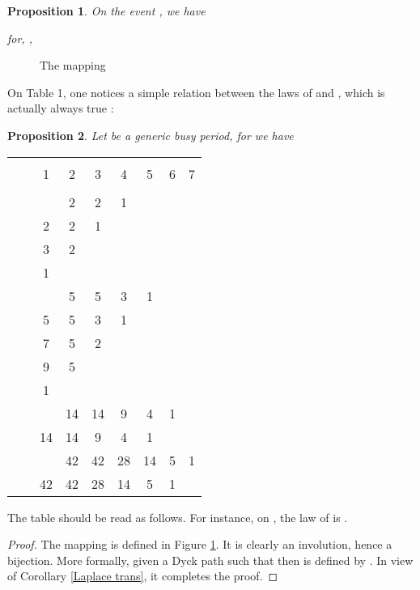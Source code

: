 \documentclass[11pt,a4paper]{article}
\numberwithin{equation}{section}
\newtheorem{prop}{Proposition}[section]
\newcommand{\1}{\mathbbm{1}}
\begin{document}
\begin{prop}\label{Rec}
On the event , we have

for, ,

\end{prop}
\begin{center}
\begin{figure}[hbt]

\caption{The mapping }
\label{Psi}
\end{figure}
\end{center}
On Table 1, one notices a simple relation between the laws of
 and , which is actually always true :
\begin{prop}
Let  be a generic busy period, for  we have

\end{prop}
\begin{center}
\begin{tabular}{|c|c|c|c|c|c|c|c|c|}
\hline
&&&&&&&& \\
&& 1 & 2 & 3 & 4 & 5 & 6 & 7  \\
&&&&&&&& \\ \hline
  & & & 2 & 2 & 1 & & & \\
 & & 2 & 2 & 1 & & &&  \\
 & & 3 & 2 & & & &&  \\
  & & 1 & & & & & & \\ \hline
  & & & 5 & 5 & 3 & 1 &&  \\
 & & 5 & 5 & 3 & 1 & &&  \\
 & &7 &5 &2 & & && \\
 & &9 &5 & & & & & \\
&  & 1 & & & & && \\ \hline
   & & &14  &14  &9  &4  &1& \\
 & &14  &14  &9  &4  &1 &&  \\ \hline
   & & & 42 & 42 & 28 & 14 &5 &1  \\
 & & 42 & 42 & 28& 14 &5 &1 &  \\  \hline
  \end{tabular}

The table should be read as follows. For instance, on , the law of  is .
\end{center}

\begin{proof}
The mapping  is defined in Figure
\ref{Psi}. It is clearly an involution, hence a bijection.
More formally, given a Dyck path  such that
 then  is
defined by . In view
of Corollary \ref{Laplace trans}, it completes the proof.
\end{proof}
\end{document}
